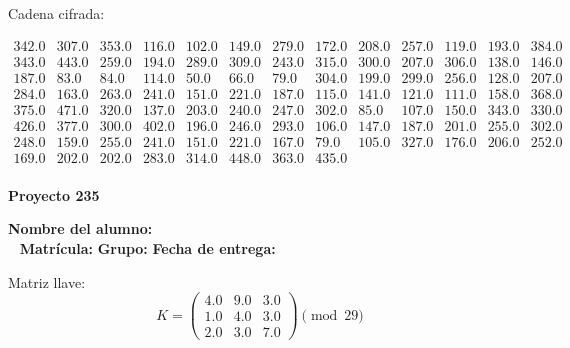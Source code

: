 \documentclass[12pt]{article}
\begin{document}
Cadena cifrada:
\begin{center}
$\begin{array}{lllllllllllll}
342.0 & 307.0 & 353.0 & 116.0 & 102.0 & 149.0 & 279.0 & 172.0 & 208.0 & 257.0 & 119.0 & 193.0 & 384.0\\
343.0 & 443.0 & 259.0 & 194.0 & 289.0 & 309.0 & 243.0 & 315.0 & 300.0 & 207.0 & 306.0 & 138.0 & 146.0\\
187.0 & 83.0 & 84.0 & 114.0 & 50.0 & 66.0 & 79.0 & 304.0 & 199.0 & 299.0 & 256.0 & 128.0 & 207.0\\
284.0 & 163.0 & 263.0 & 241.0 & 151.0 & 221.0 & 187.0 & 115.0 & 141.0 & 121.0 & 111.0 & 158.0 & 368.0\\
375.0 & 471.0 & 320.0 & 137.0 & 203.0 & 240.0 & 247.0 & 302.0 & 85.0 & 107.0 & 150.0 & 343.0 & 330.0\\
426.0 & 377.0 & 300.0 & 402.0 & 196.0 & 246.0 & 293.0 & 106.0 & 147.0 & 187.0 & 201.0 & 255.0 & 302.0\\
248.0 & 159.0 & 255.0 & 241.0 & 151.0 & 221.0 & 167.0 & 79.0 & 105.0 & 327.0 & 176.0 & 206.0 & 252.0\\
169.0 & 202.0 & 202.0 & 283.0 & 314.0 & 448.0 & 363.0 & 435.0\\
\end{array}$
\end{center}

\newpage


\textbf{Proyecto 235}

\textbf{Nombre del alumno:} \underline{\hspace{13cm}}\\\
\vspace{1cm}
\textbf{Matrícula:} \underline{\hspace{4cm}} \hspace{1cm}
\textbf{Grupo:} \underline{\hspace{2cm}}
\textbf{Fecha de entrega:} \underline{\hspace{2cm}}

\medskip

Matriz llave:
\[
K = \begin{pmatrix}
4.0 & 9.0 & 3.0\\
1.0 & 4.0 & 3.0\\
2.0 & 3.0 & 7.0
\end{pmatrix} \pmod{29}
\]
\end{document}
